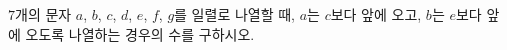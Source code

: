 $7$개의 문자 $a$, $b$, $c$, $d$, $e$, $f$, $g$를 일렬로 나열할 때, $a$는 $c$보다 앞에 오고, $b$는 $e$보다 앞에 오도록 나열하는 경우의 수를 구하시오.
